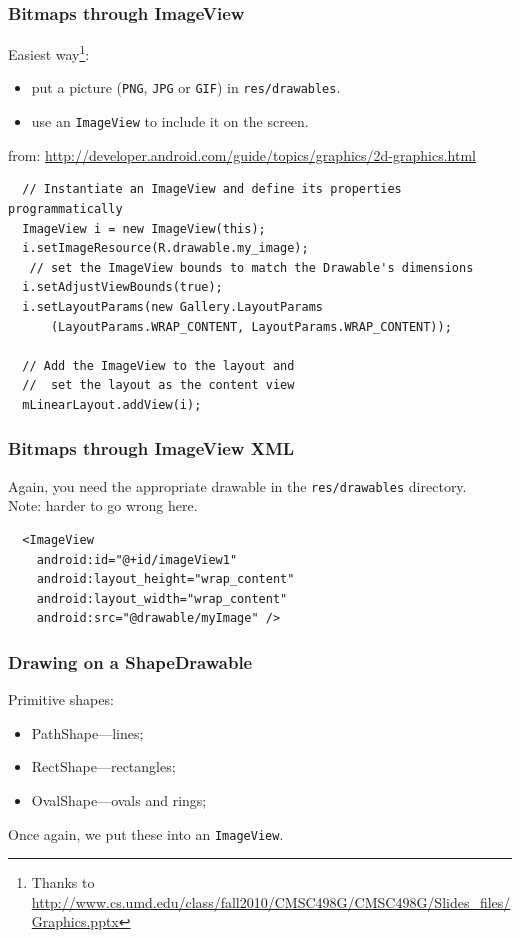 \begin{frame}[fragile]
\frametitle{Bitmaps through ImageView}

\begin{changemargin}{1cm}
Easiest way\footnote{Thanks to \scriptsize \url{http://www.cs.umd.edu/class/fall2010/CMSC498G/CMSC498G/Slides_files/Graphics.pptx}}: 
\begin{itemize}
\item put a picture ({\tt PNG}, {\tt JPG} or {\tt GIF}) in {\tt res/drawables}.
\item use an {\tt ImageView} to include it on the screen.
\end{itemize}


{\tiny from: \url{http://developer.android.com/guide/topics/graphics/2d-graphics.html}}

{\scriptsize
\begin{verbatim}
  // Instantiate an ImageView and define its properties programmatically
  ImageView i = new ImageView(this);
  i.setImageResource(R.drawable.my_image);
   // set the ImageView bounds to match the Drawable's dimensions
  i.setAdjustViewBounds(true);
  i.setLayoutParams(new Gallery.LayoutParams
      (LayoutParams.WRAP_CONTENT, LayoutParams.WRAP_CONTENT));

  // Add the ImageView to the layout and 
  //  set the layout as the content view
  mLinearLayout.addView(i);
\end{verbatim}
}
\end{changemargin}
\end{frame}


\begin{frame}[fragile]
\frametitle{Bitmaps through ImageView XML}

\begin{changemargin}{1cm}
Again, you need the appropriate drawable in the {\tt res/drawables} directory.\\[1em]
Note: harder to go wrong here.

\begin{verbatim}
  <ImageView
    android:id="@+id/imageView1"
    android:layout_height="wrap_content"
    android:layout_width="wrap_content"
    android:src="@drawable/myImage" />
\end{verbatim}

\end{changemargin}

\end{frame}

\begin{frame}[fragile]
\frametitle{Drawing on a ShapeDrawable}
\begin{changemargin}{1cm}
Primitive shapes: 
\begin{itemize}
\item PathShape---lines;
\item RectShape---rectangles;
\item OvalShape---ovals and rings;
\end{itemize}
Once again, we put these into an {\tt ImageView}.
\end{changemargin}
\end{frame}

